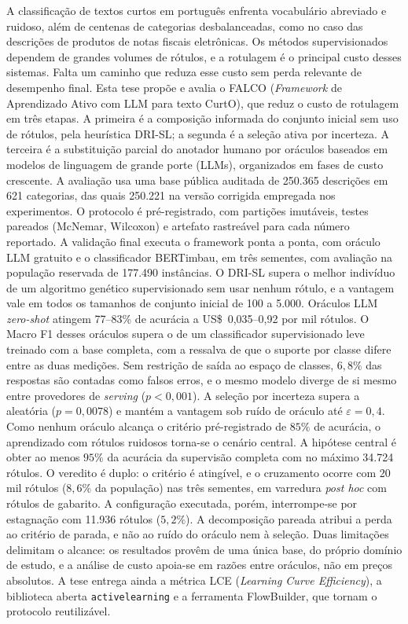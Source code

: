 \begin{resumo}

A classificação de textos curtos em português enfrenta vocabulário abreviado
e ruidoso, além de centenas de categorias desbalanceadas, como no caso das
descrições de produtos de notas fiscais eletrônicas. Os métodos
supervisionados dependem de grandes volumes de rótulos, e a rotulagem é o
principal custo desses sistemas. Falta um caminho que reduza esse custo sem
perda relevante de desempenho final. Esta tese propõe e avalia o FALCO
(\textit{Framework} de Aprendizado Ativo com LLM para texto CurtO), que reduz
o custo de rotulagem em três etapas. A primeira é a composição informada do
conjunto inicial sem uso de rótulos, pela heurística DRI-SL; a segunda é a
seleção ativa por incerteza. A terceira é a substituição parcial do anotador
humano por oráculos baseados em modelos de linguagem de grande porte (LLMs),
organizados em fases de custo crescente. A avaliação usa uma base pública
auditada de 250.365 descrições em 621 categorias, das quais 250.221 na versão
corrigida empregada nos experimentos. O protocolo é pré-registrado, com
partições imutáveis, testes pareados (McNemar, Wilcoxon) e artefato
rastreável para cada número reportado. A validação final executa o framework
ponta a ponta, com oráculo LLM gratuito e o classificador BERTimbau, em três
sementes, com avaliação na população reservada de 177.490 instâncias. O
DRI-SL supera o melhor indivíduo de um algoritmo genético supervisionado sem
usar nenhum rótulo, e a vantagem vale em todos os tamanhos de conjunto
inicial de 100 a 5.000. Oráculos LLM \textit{zero-shot} atingem 77--83\% de
acurácia a US\$~0,035--0,92 por mil rótulos. O Macro F1 desses oráculos
supera o de um classificador supervisionado leve treinado com a base
completa, com a ressalva de que o suporte por classe difere entre as duas
medições. Sem restrição de saída ao espaço de classes, $6{,}8\%$ das
respostas são contadas como falsos erros, e o mesmo modelo diverge de si
mesmo entre provedores de \textit{serving} ($p<0{,}001$). A seleção por
incerteza supera a aleatória ($p=0{,}0078$) e mantém a vantagem sob ruído de
oráculo até $\varepsilon=0{,}4$. Como nenhum oráculo alcança o critério
pré-registrado de $85\%$ de acurácia, o aprendizado com rótulos ruidosos
torna-se o cenário central. A hipótese central é obter ao menos $95\%$ da
acurácia da supervisão completa com no máximo 34.724 rótulos. O veredito é
duplo: o critério é atingível, e o cruzamento ocorre com 20 mil rótulos
($8{,}6\%$ da população) nas três sementes, em varredura \textit{post hoc}
com rótulos de gabarito. A configuração executada, porém, interrompe-se por
estagnação com 11.936 rótulos ($5{,}2\%$). A decomposição pareada atribui a
perda ao critério de parada, e não ao ruído do oráculo nem à seleção. Duas
limitações delimitam o alcance: os resultados provêm de uma única base, do
próprio domínio de estudo, e a análise de custo apoia-se em razões entre
oráculos, não em preços absolutos. A tese entrega ainda a métrica LCE
(\textit{Learning Curve Efficiency}), a biblioteca aberta
\texttt{activelearning} e a ferramenta FlowBuilder, que tornam o protocolo
reutilizável.

\end{resumo}
